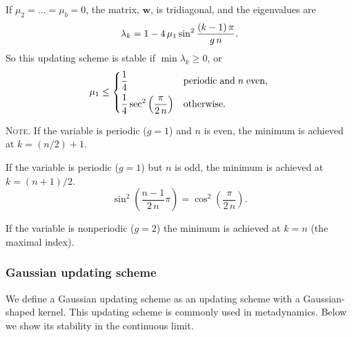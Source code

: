 \documentclass[reprint, superscriptaddress, floatfix]{revtex4-1}
\newcommand{\note}[1]{{\color{DarkGreen}\footnotesize \textsc{Note.} #1}}
\begin{document}
If $\mu_2 = \dots = \mu_b = 0$,
the matrix, $\mathbf w$, is tridiagonal,
and the eigenvalues are
\begin{equation}
  \lambda_k
  =
  1 -
  4 \, \mu_1 \sin^2
  \frac{ (k - 1) \, \pi }
       {       g \, n   }
  .
\notag
\end{equation}
%
So this updating scheme is stable if
$\min \lambda_k \ge 0$,
or
\begin{equation}
  \mu_1 \le
  \begin{dcases}
    \frac 1 4
    & \mathrm{periodic \; and \;} n \mathrm{ \; even,}
    \\
    \frac 1 4
    \sec^2
    \left( \frac{  \pi   }
                { 2 \, n }
    \right)
    & \mathrm{otherwise}.
  \end{dcases}
\notag
\end{equation}

\note{
If the variable is periodic ($g = 1$) and $n$ is even,
the minimum is achieved at $k = (n/2) + 1$.

If the variable is periodic ($g = 1$) but $n$ is odd,
the minimum is achieved at $k = (n+1)/2$.
$$
\sin^2\left(
  \frac{n-1}{2 \, n} \pi
\right)
=
\cos^2\left(
  \frac{\pi}{2 \, n}
\right)
.
$$

If the variable is nonperiodic ($g = 2$)
the minimum is achieved at $k = n$ (the maximal index).
}





\subsubsection{Gaussian updating scheme}



We define a Gaussian updating scheme
as an updating scheme with a
Gaussian-shaped kernel.
%
This updating scheme is commonly
used in metadynamics.
%
Below we show its stability
in the continuous limit.
\end{document}
